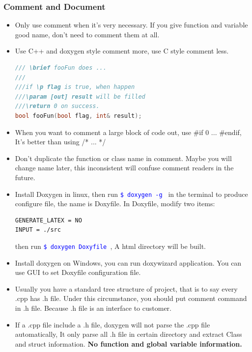 \documentclass[a4paper,12pt,twoside]{book}
\newcommand{\linuxcommand}[1]{\texttt{\textcolor{blue}{\$ #1 \Pisymbol{psy}{191}}}}
\begin{document}
\subsubsection{Comment and Document}

\begin{itemize}
\item Only use comment when it's very necessary. If you give function and variable good name, don't need to comment them at all. 

\item Use C++ and doxygen style comment more, use C style comment less.

\begin{lstlisting}[frame=single, language=c++]
/// \brief fooFun does ...
///
///if \p flag is true, when happen
///\param [out] result will be filled
///\return 0 on success.
bool fooFun(bool flag, int& result);
\end{lstlisting}

\item When you want to comment a large block of code out, use \#if 0 ...  \#endif, It's better than using /* ... */


\item Don't duplicate the function or class name in comment. Maybe you will change name later, this inconsistent will confuse comment readers in the future.

\item Install Doxygen in linux, then run \linuxcommand{doxygen -g} in the terminal to produce configure file, the name is Doxyfile.  In Doxyfile, modify two items:
\begin{verbatim}
GENERATE_LATEX = NO
INPUT = ./src
\end{verbatim}
then run \linuxcommand{doxygen Doxyfile}, A html directory will be built.

\item Install doxygen on Windows, you can run doxywizard application. You can use GUI to set Doxyfile configuration file.


\item Usually you have a standard tree structure of project, that is to say every .cpp has .h file.  Under this circumstance, you should put comment command in .h file. Because .h file is an interface to customer.

\item If a .cpp file include a .h file,  doxygen will not parse the .cpp file automatically, It only parse all .h file in certain directory and extract Class and struct information. \textbf{No function and global variable information.}


\end{itemize}
\end{document}
